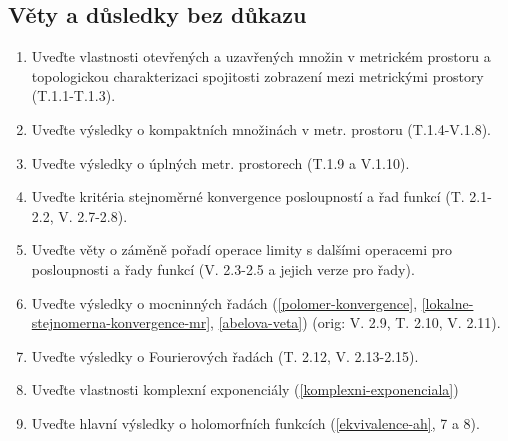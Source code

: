 \documentclass[a4paper,10pt]{article}
\begin{document}
\subsection{Věty a důsledky bez důkazu}
\setcounter{equation}{0}
\begin{enumerate}
\item Uveďte vlastnosti otevřených a uzavřených množin v metrickém prostoru 
a topologickou charakterizaci spojitosti zobrazení mezi metrickými 
prostory (T.1.1-T.1.3).
\item Uveďte výsledky o  kompaktních množinách v metr. prostoru (T.1.4-V.1.8).
\item Uveďte výsledky o  úplných metr. prostorech (T.1.9 a V.1.10).
\item Uveďte kritéria stejnoměrné konvergence posloupností a řad funkcí 
(T. 2.1-2.2, V. 2.7-2.8). 
\item Uveďte věty o záměně pořadí operace limity s dalšími operacemi pro 
posloupnosti a řady funkcí (V. 2.3-2.5 a jejich verze pro řady).
\item Uveďte výsledky o mocninných řadách (\ref{polomer-konvergence},
		\ref{lokalne-stejnomerna-konvergence-mr}, \ref{abelova-veta}) 
		(orig: V. 2.9, T. 2.10, V. 2.11).
\item Uveďte výsledky o Fourierových řadách (T. 2.12, V. 2.13-2.15).
\item Uveďte vlastnosti komplexní exponenciály (\ref{komplexni-exponenciala})
\item Uveďte hlavní výsledky o holomorfních funkcích (\ref{ekvivalence-ah}, 7 a 8).
\end{enumerate}
\end{document}
